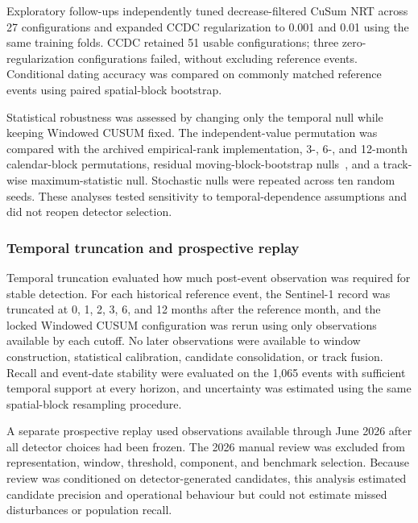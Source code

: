 Exploratory follow-ups independently tuned decrease-filtered CuSum NRT across 27 configurations and expanded CCDC regularization to 0.001 and 0.01 using the same training folds. CCDC retained 51 usable configurations; three zero-regularization configurations failed, without excluding reference events. Conditional dating accuracy was compared on commonly matched reference events using paired spatial-block bootstrap.

Statistical robustness was assessed by changing only the temporal null while keeping Windowed CUSUM fixed. The independent-value permutation was compared with the archived empirical-rank implementation, 3-, 6-, and 12-month calendar-block permutations, residual moving-block-bootstrap nulls~\citep{Kunsch1989BlockBootstrap}, and a track-wise maximum-statistic null. Stochastic nulls were repeated across ten random seeds. These analyses tested sensitivity to temporal-dependence assumptions and did not reopen detector selection.


\subsubsection{Temporal truncation and prospective replay}
\label{sec:temporal_prospective}

Temporal truncation evaluated how much post-event observation was required for stable detection. For each historical reference event, the Sentinel-1 record was truncated at 0, 1, 2, 3, 6, and 12 months after the reference month, and the locked Windowed CUSUM configuration was rerun using only observations available by each cutoff. No later observations were available to window construction, statistical calibration, candidate consolidation, or track fusion. Recall and event-date stability were evaluated on the 1,065 events with sufficient temporal support at every horizon, and uncertainty was estimated using the same spatial-block resampling procedure.

A separate prospective replay used observations available through June 2026 after all detector choices had been frozen. The 2026 manual review was excluded from representation, window, threshold, component, and benchmark selection. Because review was conditioned on detector-generated candidates, this analysis estimated candidate precision and operational behaviour but could not estimate missed disturbances or population recall.
